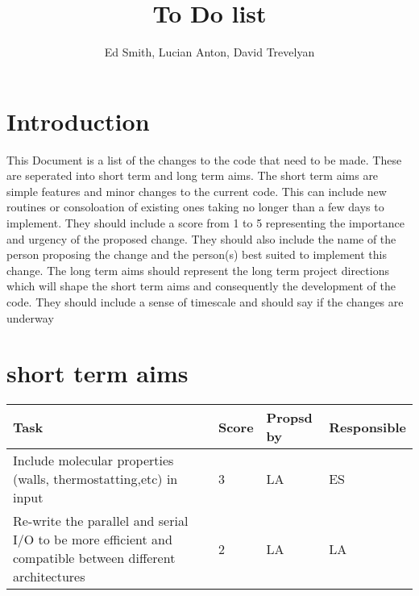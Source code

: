 \documentclass[a4paper,10pt]{article}
\numberwithin{equation}{section}
\numberwithin{figure}{section}
\begin{document}
\title{To Do list}
\author{Ed Smith, Lucian Anton, David Trevelyan}

\maketitle

\section{Introduction}

This Document is a list of the changes to the code that need to be made.
These are seperated into short term and long term aims. The short
term aims are simple features and minor changes to the current code. This can include
new routines or consoloation of existing ones taking no longer than a few days to implement.
They should include a score from 1 to 5 representing the importance and urgency of the proposed 
change. They should also include the name of the person proposing the change and the
person(s) best suited to implement this change.
The long term aims should represent the long term project directions which will
shape the short term aims and consequently the development of the code. 
They should include a sense of timescale and should say if the changes are underway

\section{short term aims}

\begin{tabular}{|p{8cm}|l|l|l|}  \hline
Task & Score & Propsd by & Responsible \\ \hline
Include molecular properties (walls, thermostatting,etc) in input & 3 & LA & ES  \\ \hline
Re-write the parallel and serial I/O to be more efficient and compatible between different architectures & 2 & LA & LA \\ \hline
\end{tabular}
\end{document}
